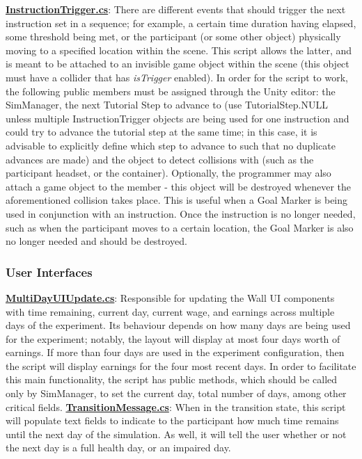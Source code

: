 \documentclass{article}
\begin{document}
\href{https://bit.ly/2uwAQ1u}{\textbf{InstructionTrigger.cs}}: There are different events that should trigger the next instruction set in a sequence; for example, a certain time duration having elapsed, some threshold being met, or the participant (or some other object) physically moving to a specified location within the scene. This script allows the latter, and is meant to be attached to an invisible game object within the scene (this object must have a collider that has \textit{isTrigger} enabled). In order for the script to work, the following public members must be assigned through the Unity editor: the SimManager, the next Tutorial Step to advance to (use TutorialStep.NULL unless multiple InstructionTrigger objects are being used for one instruction and could try to advance the tutorial step at the same time; in this case, it is advisable to explicitly define which step to advance to such that no duplicate advances are made) and the object to detect collisions with (such as the participant headset, or the container). Optionally, the programmer may also attach a game object to the  member - this object will be destroyed whenever the aforementioned collision takes place. This is useful when a Goal Marker is being used in conjunction with an instruction. Once the instruction is no longer needed, such as when the participant moves to a certain location, the Goal Marker is also no longer needed and should be destroyed. 


\subsubsection{User Interfaces}
\href{https://bit.ly/2G9SRs1}{\textbf{MultiDayUIUpdate.cs}}: Responsible for updating the Wall UI components with time remaining, current day, current wage, and earnings across multiple days of the experiment. Its behaviour depends on how many days are being used for the experiment; notably, the layout will display at most four days worth of earnings. If more than four days are used in the experiment configuration, then the script will display earnings for the four most recent days. In order to facilitate this main functionality, the script has public methods, which should be called only by SimManager, to set the current day, total number of days, among other critical fields. \newline \newline
\href{https://bit.ly/2VHtW5B}{\textbf{TransitionMessage.cs}}: When in the transition state, this script will populate text fields to indicate to the participant how much time remains until the next day of the simulation. As well, it will tell the user whether or not the next day is a full health day, or an impaired day. \newline \newline
\end{document}
